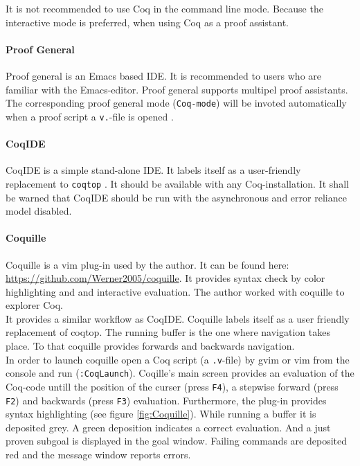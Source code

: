 It is not recommended to use Coq in the command line mode. 
Because the interactive mode is preferred, when using Coq as a proof assistant. 


\paragraph{Proof General}

Proof general is an Emacs based IDE. 
It is recommended to users who are familiar with the Emacs-editor.
Proof general supports multipel proof assistants. The corresponding proof general mode (\lstinline!Coq-mode!) will be invoted automatically when a proof script a \lstinline!v.!-file is opened \cite{PROOFGENERAL}. 
\paragraph{CoqIDE}

CoqIDE is a simple stand-alone IDE. 
It labels itself as a user-friendly replacement to \lstinline!coqtop! \cite{COQIDE}.   
It should be available with any Coq-installation. 
It shall be warned that CoqIDE should be run with the asynchronous and error reliance model disabled. 

\paragraph{Coquille}

Coquille is a vim plug-in used by the author.
It can be found here: \url{https://github.com/Werner2005/coquille}.
It provides syntax check by color highlighting and and interactive evaluation.  
The author worked with coquille to explorer Coq.\\
It provides a similar workflow as CoqIDE. 
Coquille labels itself as a user friendly  replacement of \gls{coqtop}. 
The running buffer is the one where navigation takes place. 
To that coquille provides forwards and backwards navigation.\\


In order to launch coquille open a Coq script (a \texttt{.v}-file) by gvim or vim from the console and run (\texttt{:CoqLaunch}). 
Coqille's main screen provides an evaluation of the Coq-code untill the position of the curser (press \texttt{F4}), a stepwise forward (press \texttt{F2}) and backwards (press \texttt{F3}) evaluation.                 
Furthermore, the plug-in provides syntax highlighting (see figure \ref{fig:Coquille}).
While running a buffer it is deposited grey.
A green deposition indicates a correct evaluation. 
And a just proven subgoal is displayed in the goal window. 
Failing commands are deposited red and the message window reports errors.

